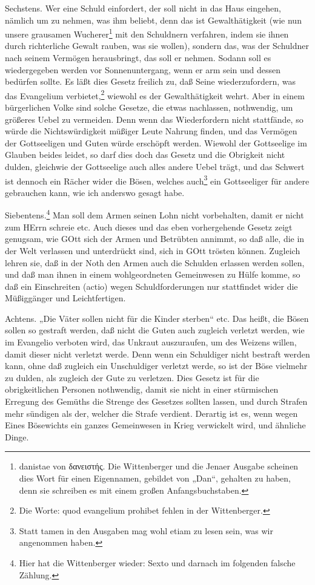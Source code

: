 Sechstens. Wer eine Schuld einfordert, der soll nicht in das Haus eingehen, nämlich um zu nehmen, was ihm beliebt, denn das ist Gewalthätigkeit (wie nun unsere grausamen Wucherer\footnote{danistae von δανειστής. Die Wittenberger und die Jenaer Ausgabe scheinen dies Wort für einen Eigennamen, gebildet von „Dan“, gehalten zu haben, denn sie schreiben es mit einem großen Anfangsbuchstaben.} mit den Schuldnern verfahren, indem sie ihnen durch richterliche Gewalt rauben, was sie wollen), sondern das, was der Schuldner nach seinem Vermögen herausbringt, das soll er nehmen. Sodann soll es wiedergegeben werden vor Sonnenuntergang, wenn er arm sein und dessen bedürfen sollte. Es läßt dies Gesetz freilich zu, daß Seine wiederzufordern, was das Evangelium verbietet,\footnote{Die Worte: quod evangelium prohibet fehlen in der Wittenberger.} wiewohl es der Gewalthätigkeit wehrt. Aber in einem bürgerlichen Volke sind solche Gesetze, die etwas nachlassen, nothwendig, um größeres Uebel zu vermeiden. Denn wenn das Wiederfordern nicht stattfände, so würde die Nichtswürdigkeit müßiger Leute Nahrung finden, und das Vermögen der Gottseeligen und Guten würde erschöpft werden. Wiewohl der Gottseelige im Glauben beides leidet, so darf dies doch das Gesetz und die Obrigkeit nicht dulden, gleichwie der Gottseelige auch alles andere Uebel trägt, und das Schwert ist dennoch ein Rächer wider die Bösen, welches auch\footnote{Statt tamen in den Ausgaben mag wohl etiam zu lesen sein, was wir angenommen haben.} ein Gottseeliger für andere gebrauchen kann, wie ich anderswo gesagt habe.

Siebentens.\footnote{Hier hat die Wittenberger wieder: Sexto und darnach im folgenden falsche Zählung.} Man soll dem Armen seinen Lohn nicht vorbehalten, damit er nicht zum HErrn schreie etc. Auch dieses und das eben vorhergehende Gesetz zeigt genugsam, wie GOtt sich der Armen und Betrübten annimmt, so daß alle, die in der Welt verlassen und unterdrückt sind, sich in GOtt trösten können. Zugleich lehren sie, daß in der Noth den Armen auch die Schulden erlassen werden sollen, und daß man ihnen in einem wohlgeordneten Gemeinwesen zu Hülfe komme, so daß ein Einschreiten (actio) wegen Schuldforderungen nur stattfindet wider die Müßiggänger und Leichtfertigen.

Achtens. „Die Väter sollen nicht für die Kinder sterben“ etc. Das heißt, die Bösen sollen so gestraft werden, daß nicht die Guten auch zugleich verletzt werden, wie im Evangelio verboten wird, das Unkraut auszuraufen, um des Weizens willen, damit dieser nicht verletzt werde. Denn wenn ein Schuldiger nicht bestraft werden kann, ohne daß zugleich ein Unschuldiger verletzt werde, so ist der Böse vielmehr zu dulden, als zugleich der Gute zu verletzen. Dies Gesetz ist für die obrigkeitlichen Personen nothwendig, damit sie nicht in einer stürmischen Erregung des Gemüths die Strenge des Gesetzes sollten lassen, und durch Strafen mehr sündigen als der, welcher die Strafe verdient. Derartig ist es, wenn wegen Eines Bösewichts ein ganzes Gemeinwesen in Krieg verwickelt wird, und ähnliche Dinge.

